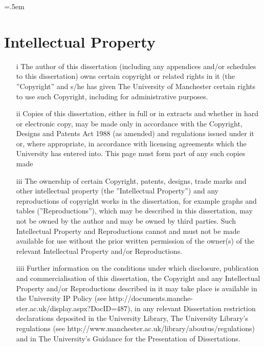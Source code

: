 \begingroup\emergencystretch=.5em
\let\clearpage\relax
\let\cleardoublepage\relax
\let\cleardoublepage\relax

\chapter*{Intellectual Property}
\begin{enumerate}
	\item[i] The author of this dissertation (including any appendices and/or schedules to this dissertation) owns certain copyright or related rights in it (the ''Copyright'' and s/he has given The University of Manchester certain rights to use such Copyright, including for administrative purposes.
	\item[ii]Copies of this dissertation, either in full or in extracts and whether in hard or electronic copy, may be made only in accordance with the Copyright, Designs and Patents Act 1988 (as amended) and regulations issued under it or, where appropriate, in accordance with licensing agreements which the University has entered into. This page must form part of any such copies made
	\item[iii]The ownership of certain Copyright, patents, designs, trade marks and other intellectual property (the ''Intellectual Property'') and any reproductions of copyright works in the dissertation, for example graphs and tables (''Reproductions''), which may be described in this dissertation, may not be owned by the author and may be owned by third parties. Such Intellectual Property and Reproductions cannot and must not be made available for use without the prior written permission of the owner(s) of the relevant Intellectual Property and/or Reproductions.
	\item[iiii]Further information on the conditions under which disclosure, publication and commercialisation of this dissertation, the Copyright and any Intellectual Property and/or Reproductions described in it may take place is available in the University IP Policy (see http://documents.manche-ster.ac.uk/display.aspx?DocID=487), in any relevant Dissertation restriction declarations deposited in the University Library, The University Library's regulations (see http://www.manchester.ac.uk/library/aboutus/regulations) and in The University's Guidance for the Presentation of Dissertations.
\end{enumerate}

\vfill

\endgroup			

\vfill